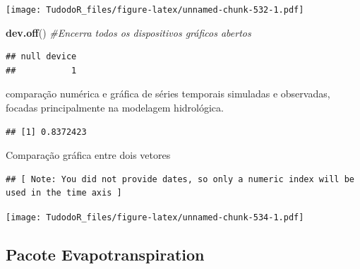 \documentclass[
]{book}
\newenvironment{Shaded}{\begin{snugshade}}{\end{snugshade}}
\newcommand{\CommentTok}[1]{\textcolor[rgb]{0.56,0.35,0.01}{\textit{#1}}}
\newcommand{\DataTypeTok}[1]{\textcolor[rgb]{0.13,0.29,0.53}{#1}}
\newcommand{\KeywordTok}[1]{\textcolor[rgb]{0.13,0.29,0.53}{\textbf{#1}}}
\newcommand{\NormalTok}[1]{#1}
\newcommand{\OperatorTok}[1]{\textcolor[rgb]{0.81,0.36,0.00}{\textbf{#1}}}
\begin{document}
\texttt{[image: TudodoR\_files/figure-latex/unnamed-chunk-532-1.pdf]}

\begin{Shaded}
\begin{Highlighting}[]
\KeywordTok{dev.off}\NormalTok{() }\CommentTok{#Encerra todos os dispositivos gráficos abertos}
\end{Highlighting}
\end{Shaded}

\begin{verbatim}
## null device 
##           1
\end{verbatim}

comparação numérica e gráfica de séries temporais simuladas e observadas, focadas principalmente na modelagem hidrológica.

\begin{Shaded}
\end{Shaded}

\begin{verbatim}
## [1] 0.8372423
\end{verbatim}

Comparação gráfica entre dois vetores

\begin{Shaded}
\end{Shaded}

\begin{verbatim}
## [ Note: You did not provide dates, so only a numeric index will be used in the time axis ]
\end{verbatim}

\texttt{[image: TudodoR\_files/figure-latex/unnamed-chunk-534-1.pdf]}

\hypertarget{pacote-evapotranspiration}{%
\subsection{Pacote Evapotranspiration}\label{pacote-evapotranspiration}}
\end{document}
